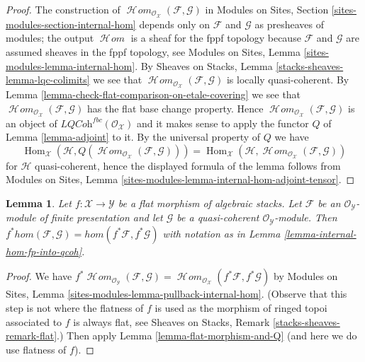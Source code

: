 \documentclass{stacks-project}
\theoremstyle{plain}
\newtheorem{lemma}[subsection]{Lemma}
\theoremstyle{definition}
\theoremstyle{remark}
\numberwithin{equation}{subsection}
\def\Hom{\mathop{\mathrm{Hom}}\nolimits}
\def\SheafHom{\mathop{\mathcal{H}\!\mathit{om}}\nolimits}
\begin{document}
\begin{proof}
The construction of
$\SheafHom_{\mathcal{O}_\mathcal{X}}(\mathcal{F}, \mathcal{G})$ in
Modules on Sites, Section \ref{sites-modules-section-internal-hom}
depends only on $\mathcal{F}$ and $\mathcal{G}$ as presheaves
of modules; the output $\SheafHom$ is a sheaf for the fppf
topology because $\mathcal{F}$ and $\mathcal{G}$ are assumed
sheaves in the fppf topology, see
Modules on Sites, Lemma \ref{sites-modules-lemma-internal-hom}.
By Sheaves on Stacks, Lemma \ref{stacks-sheaves-lemma-lqc-colimits}
we see that $\SheafHom_{\mathcal{O}_\mathcal{X}}(\mathcal{F}, \mathcal{G})$
is locally quasi-coherent.
By Lemma \ref{lemma-check-flat-comparison-on-etale-covering}
we see that $\SheafHom_{\mathcal{O}_\mathcal{X}}(\mathcal{F}, \mathcal{G})$
has the flat base change property. Hence
$\SheafHom_{\mathcal{O}_\mathcal{X}}(\mathcal{F}, \mathcal{G})$
is an object of $\textit{LQCoh}^{fbc}(\mathcal{O}_\mathcal{X})$
and it makes sense to apply the functor $Q$ of Lemma \ref{lemma-adjoint}
to it. By the universal property of $Q$ we have
$$
\Hom_\mathcal{X}(\mathcal{H},
Q(\SheafHom_{\mathcal{O}_\mathcal{X}}(\mathcal{F}, \mathcal{G}))) =
\Hom_\mathcal{X}(\mathcal{H},
\SheafHom_{\mathcal{O}_\mathcal{X}}(\mathcal{F}, \mathcal{G}))
$$
for $\mathcal{H}$ quasi-coherent, hence the displayed formula 
of the lemma follows from Modules on Sites, Lemma
\ref{sites-modules-lemma-internal-hom-adjoint-tensor}.
\end{proof}

\begin{lemma}
\label{lemma-flat-morphism-and-hom}
Let $f : \mathcal{X} \to \mathcal{Y}$ be a flat morphism of algebraic stacks.
Let $\mathcal{F}$ be an
$\mathcal{O}_\mathcal{Y}$-module of finite presentation and let
$\mathcal{G}$ be a quasi-coherent $\mathcal{O}_\mathcal{Y}$-module.
Then $f^*hom(\mathcal{F}, \mathcal{G}) = hom(f^*\mathcal{F}, f^*\mathcal{G})$
with notation as in Lemma \ref{lemma-internal-hom-fp-into-qcoh}.
\end{lemma}

\begin{proof}
We have $f^*\SheafHom_{\mathcal{O}_\mathcal{Y}}(\mathcal{F}, \mathcal{G}) =
\SheafHom_{\mathcal{O}_\mathcal{X}}(f^*\mathcal{F}, f^*\mathcal{G})$
by Modules on Sites, Lemma \ref{sites-modules-lemma-pullback-internal-hom}.
(Observe that this step is not where the flatness of $f$ is used
as the morphism of ringed topoi associated to $f$ is always flat, see
Sheaves on Stacks, Remark \ref{stacks-sheaves-remark-flat}.)
Then apply Lemma \ref{lemma-flat-morphism-and-Q} (and here we do use
flatness of $f$).
\end{proof}
\end{document}
